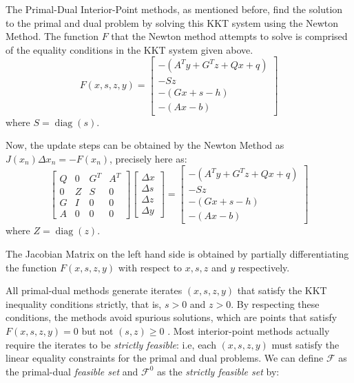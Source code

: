 The Primal-Dual Interior-Point methods, as mentioned before, find the solution to the primal and dual problem by solving this KKT system using the Newton Method. The function $F$ that the Newton method attempts to solve is comprised of the equality conditions in the KKT system given above. 
\begin{equation}\label{newton-fn}
F(x,s,z,y)=\left[\begin{array}{c}-\left(A^{T} y+G^{T} z+Q x+q\right) \\ -S z \\ -(G x+s-h) \\ -(A x-b)\end{array}\right]
\end{equation}
\hspace{30pt}where $S=\operatorname{diag}(s)$. \par
Now, the update steps can be obtained by the Newton Method as {\(J(x_n) \Delta x_n=-F(x_n)\)}, precisely here as:
\begin{equation} \label{KKT}
\left[\begin{array}{cccc}Q & 0 & G^{T} & A^{T} \\ 0 & Z & S & 0 \\ G & I & 0 & 0 \\ A & 0 & 0 & 0\end{array}\right]\left[\begin{array}{c}\Delta x \\ \Delta s \\ \Delta z \\ \Delta y\end{array}\right]=\left[\begin{array}{c}-\left(A^{T} y+G^{T} z+Q x+q\right) \\ -S z \\ -(G x+s-h) \\ -(A x-b)\end{array}\right]
\end{equation}
\hspace{30pt}where $Z=\operatorname{diag}(z)$\cite{mattingley2012cvxgen}.\par
The Jacobian Matrix on the left hand side is obtained by partially differentiating the function $F(x,s,z,y)$ with respect to $x,s,z$ and $y$ respectively.\par
All primal-dual methods generate iterates $(x,s,z,y)$ that satisfy the KKT inequality conditions strictly, that is, $s>0$ and $z>0$. By respecting these conditions, the methods avoid spurious solutions, which are points that satisfy $F(x,s,z,y)=0$ but not $(s,z) \geq 0$ \cite{wright1997primal}. Most interior-point methods actually require the iterates to be \textit{strictly feasible}: i.e, each $(x,s,z,y)$ must satisfy the linear equality constraints for the primal and dual problems. We can define $\mathcal{F}$ as the primal-dual \textit{feasible set} and $\mathcal{F}^0$ as the \textit{strictly feasible set} by:
